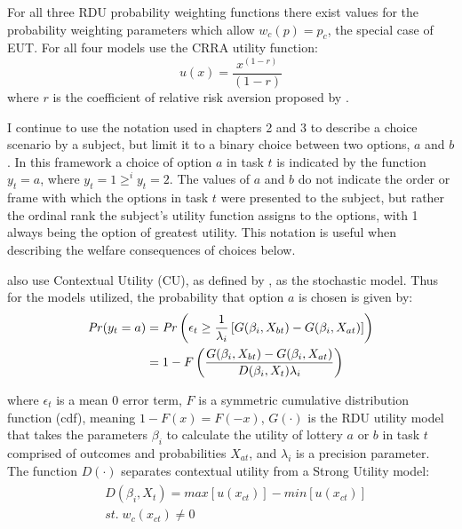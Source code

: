 \documentclass[../main.tex]{subfiles}
\begin{document}
For all three RDU probability weighting functions there exist values for the probability weighting parameters which allow $w_c(p) = p_c$, the special case of EUT.
For all four models \textcite{Harrison2016} use the CRRA utility function:
\begin{equation}
	\label{eq4:CRRA}
	u(x) = \frac{x^{(1-r)}}{(1-r)}
\end{equation}
\noindent where $r$ is the coefficient of relative risk aversion proposed by \textcite{Pratt1964}.

I continue to use the notation used in chapters 2 and 3 to describe a choice scenario by a subject, but limit it to a binary choice between two options, $a$ and $b$.
In this framework a choice of option $a$ in task $t$ is indicated by the function $y_t = a$, where $y_t = 1 \geq^i y_t = 2$.
The values of $a$ and $b$ do not indicate the order or frame with which the options in task $t$ were presented to the subject, but rather the ordinal rank the subject's utility function assigns to the options, with 1 always being the option of greatest utility.
This notation is useful when describing the welfare consequences of choices below.

\textcite{Harrison2016} also use Contextual Utility (CU), as defined by \textcite{Wilcox2008}, as the stochastic model.
Thus for the models utilized, the probability that option $a$ is chosen is given by:
\begin{align}
	\label{eq4:RE.2}
	\begin{split}
		{\ensuremath{\mathit{Pr}}}(y_t = a) &= {\mathit{Pr}}\left(  \epsilon_t \geq \frac{1}{\lambda_i} \left[ G(\beta_i,X_{bt}) - G(\beta_i,X_{at}) \right] \right)\\
		&= 1 - F\left( \dfrac{G(\beta_i,X_{bt}) - G(\beta_i,X_{at})}{D(\beta_i,X_t)\lambda_i }  \right)
	\end{split}
\end{align}

\noindent where $\epsilon_t$ is a mean 0 error term, $F$ is a symmetric cumulative distribution function (cdf), meaning $1 - F(x)  = F(-x)$, $G(\cdot)$ is the RDU utility model that takes the parameters $\beta_i$ to calculate the utility of lottery $a$ or $b$ in task $t$ comprised of outcomes and probabilities $X_{at}$, and $\lambda_i$ is a precision parameter.
The function $D(\cdot)$ separates contextual utility from a Strong Utility model:
\begin{align}
	\label{eq4:W.cu}
	\begin{split}
		&D(\beta_i,X_t) = \mathit{max}[u(x_{ct})] - \mathit{min}[u(x_{ct})]\\
		&\mathit{st.}\; w_c(x_{ct}) \neq 0
	\end{split}
\end{align}
\end{document}
